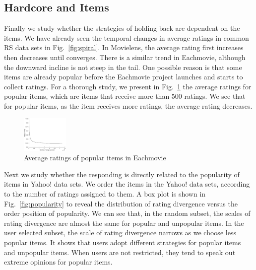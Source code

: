 \documentclass[sigconf]{acmart}
\begin{document}
\subsection{Hardcore and Items}
Finally we study whether the strategies of holding back are dependent on the items. We have already seen the temporal changes in average ratings in common RS data sets in Fig.~\ref{fig:spiral}. In Movielens, the average rating first increases then decreases until converges. There is a similar trend in Eachmovie, although the downward incline is not steep in the tail. One possible reason is that some items are already popular before the Eachmovie project launches and starts to collect ratings. For a thorough study, we present in Fig.~\ref{fig:ratingpopulareachmovie} the average ratings for popular items, which are items that receive more than 500 ratings. We see that for popular items, as the item receives more ratings, the average rating decreases.

\begin{figure}[htbp]
\centering
\begin{center}
\includegraphics[width=0.2\textwidth]{fig8_eachmovie_popular.eps}
\caption{{Average ratings of popular items in Eachmovie}}
\label{fig:ratingpopulareachmovie}
\end{center}
\end{figure}

Next we study whether the responding is directly related to the popularity of items in Yahoo! data sets. We order the items in the Yahoo! data sets, according to the number of ratings assigned to them. A box plot is shown in Fig.~\ref{fig:popularity} to reveal the distribution of rating divergence versus the order position of popularity. We can see that, in the random subset, the scales of rating divergence are almost the same for popular and unpopular items. In the user selected subset, the scale of rating divergence narrows as we choose less popular items. It shows that users adopt different strategies for popular items and unpopular items. When users are  not restricted,  they tend to speak out extreme opinions for popular items.
\end{document}
